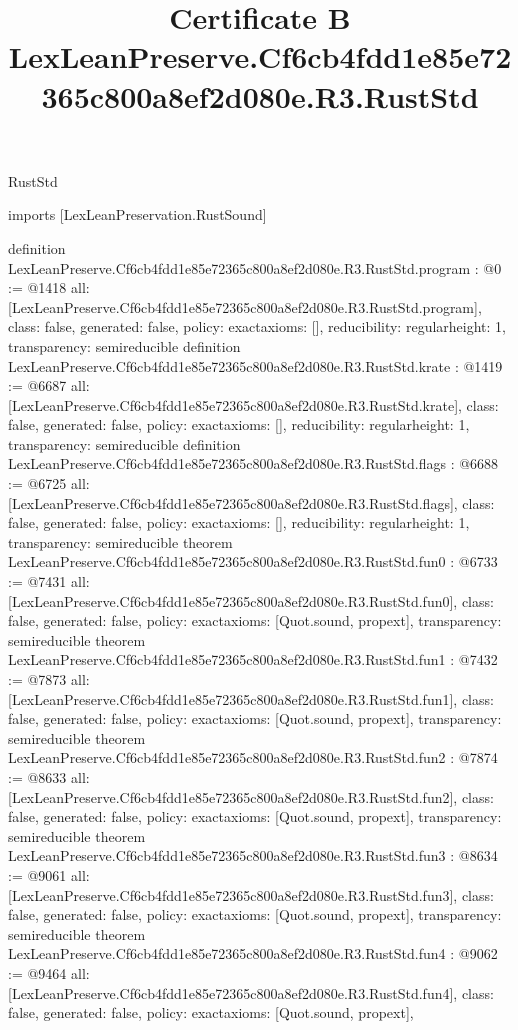 \begin{lexlean}{RustStd}
\title{Certificate B LexLeanPreserve.Cf6cb4fdd1e85e72365c800a8ef2d080e.R3.RustStd}
\begin{coremodule}
imports [LexLeanPreservation.RustSound]

definition LexLeanPreserve.Cf6cb4fdd1e85e72365c800a8ef2d080e.R3.RustStd.program : @0 := @1418 {
  all: [LexLeanPreserve.Cf6cb4fdd1e85e72365c800a8ef2d080e.R3.RustStd.program],
  class: false,
  generated: false,
  policy: exact{axioms: []},
  reducibility: regular{height: 1},
  transparency: semireducible
}
definition LexLeanPreserve.Cf6cb4fdd1e85e72365c800a8ef2d080e.R3.RustStd.krate : @1419 := @6687 {
  all: [LexLeanPreserve.Cf6cb4fdd1e85e72365c800a8ef2d080e.R3.RustStd.krate],
  class: false,
  generated: false,
  policy: exact{axioms: []},
  reducibility: regular{height: 1},
  transparency: semireducible
}
definition LexLeanPreserve.Cf6cb4fdd1e85e72365c800a8ef2d080e.R3.RustStd.flags : @6688 := @6725 {
  all: [LexLeanPreserve.Cf6cb4fdd1e85e72365c800a8ef2d080e.R3.RustStd.flags],
  class: false,
  generated: false,
  policy: exact{axioms: []},
  reducibility: regular{height: 1},
  transparency: semireducible
}
theorem LexLeanPreserve.Cf6cb4fdd1e85e72365c800a8ef2d080e.R3.RustStd.fun0 : @6733 := @7431 {
  all: [LexLeanPreserve.Cf6cb4fdd1e85e72365c800a8ef2d080e.R3.RustStd.fun0],
  class: false,
  generated: false,
  policy: exact{axioms: [Quot.sound, propext]},
  transparency: semireducible
}
theorem LexLeanPreserve.Cf6cb4fdd1e85e72365c800a8ef2d080e.R3.RustStd.fun1 : @7432 := @7873 {
  all: [LexLeanPreserve.Cf6cb4fdd1e85e72365c800a8ef2d080e.R3.RustStd.fun1],
  class: false,
  generated: false,
  policy: exact{axioms: [Quot.sound, propext]},
  transparency: semireducible
}
theorem LexLeanPreserve.Cf6cb4fdd1e85e72365c800a8ef2d080e.R3.RustStd.fun2 : @7874 := @8633 {
  all: [LexLeanPreserve.Cf6cb4fdd1e85e72365c800a8ef2d080e.R3.RustStd.fun2],
  class: false,
  generated: false,
  policy: exact{axioms: [Quot.sound, propext]},
  transparency: semireducible
}
theorem LexLeanPreserve.Cf6cb4fdd1e85e72365c800a8ef2d080e.R3.RustStd.fun3 : @8634 := @9061 {
  all: [LexLeanPreserve.Cf6cb4fdd1e85e72365c800a8ef2d080e.R3.RustStd.fun3],
  class: false,
  generated: false,
  policy: exact{axioms: [Quot.sound, propext]},
  transparency: semireducible
}
theorem LexLeanPreserve.Cf6cb4fdd1e85e72365c800a8ef2d080e.R3.RustStd.fun4 : @9062 := @9464 {
  all: [LexLeanPreserve.Cf6cb4fdd1e85e72365c800a8ef2d080e.R3.RustStd.fun4],
  class: false,
  generated: false,
  policy: exact{axioms: [Quot.sound, propext]},
}
\end{coremodule}
\end{lexlean}
